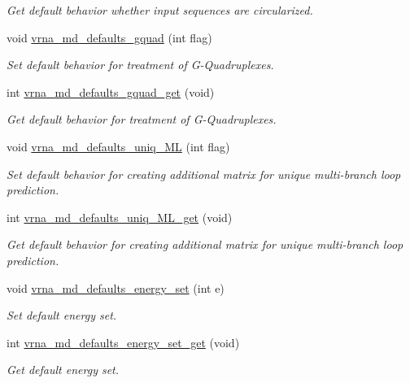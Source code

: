 \begin{DoxyCompactItemize}
\begin{DoxyCompactList}\small\item\em Get default behavior whether input sequences are circularized. \end{DoxyCompactList}\item 
void \hyperlink{group__model__details_ga0685ca2aeb39af76f2421fc308163dce}{vrna\+\_\+md\+\_\+defaults\+\_\+gquad} (int flag)
\begin{DoxyCompactList}\small\item\em Set default behavior for treatment of G-\/\+Quadruplexes. \end{DoxyCompactList}\item 
int \hyperlink{group__model__details_gae645b8612f879eb38b45244fa9eddb9e}{vrna\+\_\+md\+\_\+defaults\+\_\+gquad\+\_\+get} (void)
\begin{DoxyCompactList}\small\item\em Get default behavior for treatment of G-\/\+Quadruplexes. \end{DoxyCompactList}\item 
void \hyperlink{group__model__details_ga59b944f61c5d2babec2d4c48c820de67}{vrna\+\_\+md\+\_\+defaults\+\_\+uniq\+\_\+\+ML} (int flag)
\begin{DoxyCompactList}\small\item\em Set default behavior for creating additional matrix for unique multi-\/branch loop prediction. \end{DoxyCompactList}\item 
int \hyperlink{group__model__details_gab48e70fd024bf838404bcbcca0c874a0}{vrna\+\_\+md\+\_\+defaults\+\_\+uniq\+\_\+\+M\+L\+\_\+get} (void)
\begin{DoxyCompactList}\small\item\em Get default behavior for creating additional matrix for unique multi-\/branch loop prediction. \end{DoxyCompactList}\item 
void \hyperlink{group__model__details_ga8dd29c55787a4576277e1907e92d810c}{vrna\+\_\+md\+\_\+defaults\+\_\+energy\+\_\+set} (int e)
\begin{DoxyCompactList}\small\item\em Set default energy set. \end{DoxyCompactList}\item 
int \hyperlink{group__model__details_ga017ed6afb1cba2b7f242412cab618b53}{vrna\+\_\+md\+\_\+defaults\+\_\+energy\+\_\+set\+\_\+get} (void)
\begin{DoxyCompactList}\small\item\em Get default energy set. \end{DoxyCompactList}\item 

\end{DoxyCompactItemize}
